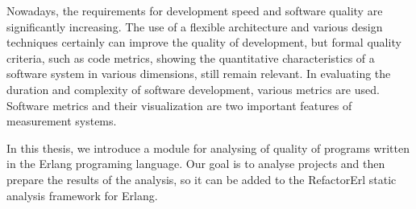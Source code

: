 
Nowadays, the requirements for development speed and software quality are significantly increasing. The use of a flexible architecture and various design techniques certainly can improve the quality of development, but formal quality criteria, such as code metrics, showing the quantitative characteristics of a software system in various dimensions, still remain relevant. In evaluating the duration and complexity of software development, various metrics are used.
Software metrics and their visualization are two important features of   measurement systems. 

In this thesis, we introduce a module for analysing of quality of programs written in the Erlang programing language. Our goal is to analyse
projects and then prepare the results of the analysis, so it can be added to the RefactorErl static analysis framework for Erlang.